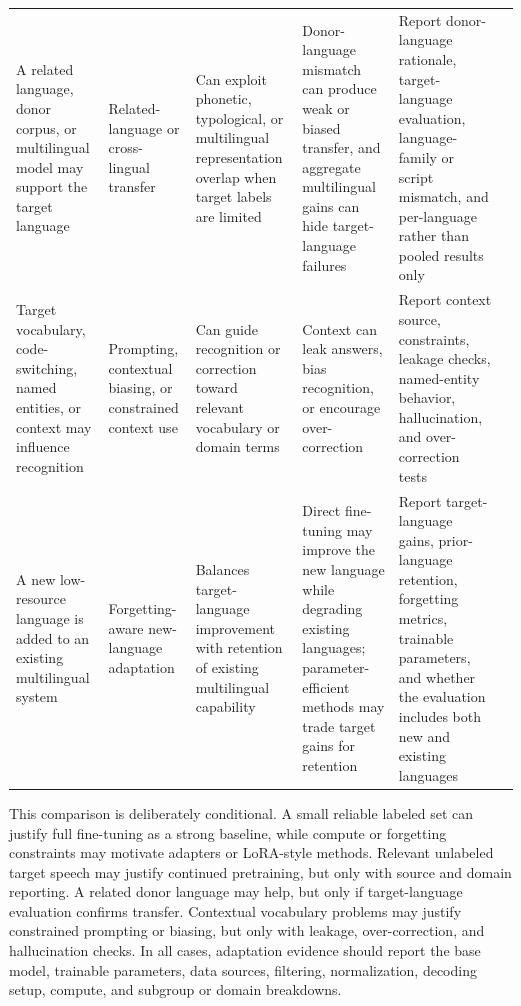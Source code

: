 \documentclass[pdflatex,sn-basic]{sn-jnl}
\theoremstyle{thmstyleone}
\theoremstyle{thmstyletwo}
\theoremstyle{thmstylethree}
\begin{document}
\begin{table}[htbp]
\begin{tabularx}{\textwidth}{YYYYYY}
A related language, donor corpus, or multilingual model may support the target language & Related-language or cross-lingual transfer & Can exploit phonetic, typological, or multilingual representation overlap when target labels are limited & Donor-language mismatch can produce weak or biased transfer, and aggregate multilingual gains can hide target-language failures & Report donor-language rationale, target-language evaluation, language-family or script mismatch, and per-language rather than pooled results only & \citep{conneau21_interspeech,feng23_interspeech} \\
Target vocabulary, code-switching, named entities, or context may influence recognition & Prompting, contextual biasing, or constrained context use & Can guide recognition or correction toward relevant vocabulary or domain terms & Context can leak answers, bias recognition, or encourage over-correction & Report context source, constraints, leakage checks, named-entity behavior, hallucination, and over-correction tests & \citep{ma2024asrerrorcorrection,wang2025contextasrbench} \\
A new low-resource language is added to an existing multilingual system & Forgetting-aware new-language adaptation & Balances target-language improvement with retention of existing multilingual capability & Direct fine-tuning may improve the new language while degrading existing languages; parameter-efficient methods may trade target gains for retention & Report target-language gains, prior-language retention, forgetting metrics, trainable parameters, and whether the evaluation includes both new and existing languages & \citep{qian24_interspeech} \\
\bottomrule
\end{tabularx}
\end{table}

This comparison is deliberately conditional. A small reliable labeled set can justify full fine-tuning as a strong baseline, while compute or forgetting constraints may motivate adapters or LoRA-style methods. Relevant unlabeled target speech may justify continued pretraining, but only with source and domain reporting. A related donor language may help, but only if target-language evaluation confirms transfer. Contextual vocabulary problems may justify constrained prompting or biasing, but only with leakage, over-correction, and hallucination checks. In all cases, adaptation evidence should report the base model, trainable parameters, data sources, filtering, normalization, decoding setup, compute, and subgroup or domain breakdowns.
\end{document}
